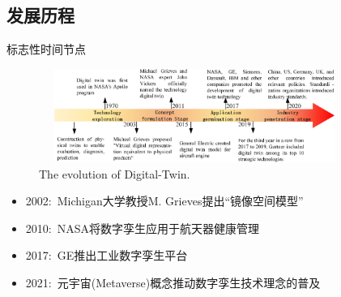 \subsection{发展历程}
\begin{frame}{标志性时间节点}
\begin{figure}[h!]
\centering
     \includegraphics[height=1.2in, width=4.0in, viewport=0 0 1416 471,clip]{Figures/Evolution_of_Digital-Twin.png}
\caption{\tiny \textrm{The evolution of Digital-Twin.}}%
\label{Fig:Evolution_of_Digital-Twin}
\end{figure}

  \begin{itemize}
	  \item \textrm{2002:~Michigan}大学教授\textrm{M. Grieves}提出``镜像空间模型''
	  \item \textrm{2010:~NASA}将数字孪生应用于航天器健康管理
	  \item \textrm{2017:~GE}推出工业数字孪生平台
	  \item \textrm{2021:~}元宇宙\textrm{(Metaverse)}概念推动数字孪生技术理念的普及
  \end{itemize}
\end{frame}

